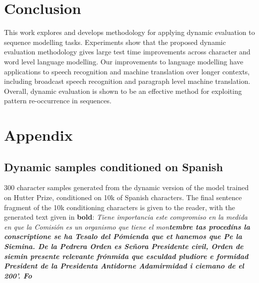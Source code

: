 \documentclass{article} \usepackage{iclr2018_conference,times}
\begin{document}
\section{Conclusion}

This work explores and develops methodology for applying dynamic evaluation to sequence modelling tasks. Experiments show that the proposed dynamic evaluation methodology gives large test time improvements across character and word level language modelling. Our improvements to language modelling have applications to speech recognition and machine translation over longer contexts, including broadcast speech recognition and paragraph level machine translation. Overall, dynamic evaluation is shown to be an effective method for exploiting pattern re-occurrence in sequences.



{\setlength{\bibsep}{0pt plus 0.3ex}\footnotesize

}
\appendix
\section{Appendix}
\subsection{Dynamic samples conditioned on Spanish}
300 character samples generated from the dynamic version of the model trained on Hutter Prize, conditioned on 10k of Spanish characters. The final sentence fragment of the 10k conditioning characters is given to the reader, with the generated text given in \textbf{bold}:
\newline
\newline
\newline
\textsl{
Tiene importancia este compromiso en la medida en que la Comisión es un organismo que tiene el mon\textbf{tembre tas procedíns la conscriptione se ha Tesalo del Pómienda que et hanemos que Pe la Siemina.
\newline
De la Pedrera Orden es Señora Presidente civil, Orden de siemin presente relevante frónmida que esculdad pludiore e formidad President de la Presidenta Antidorne Adamirmidad i ciemano de el 200'. Fo}
}
\end{document}
